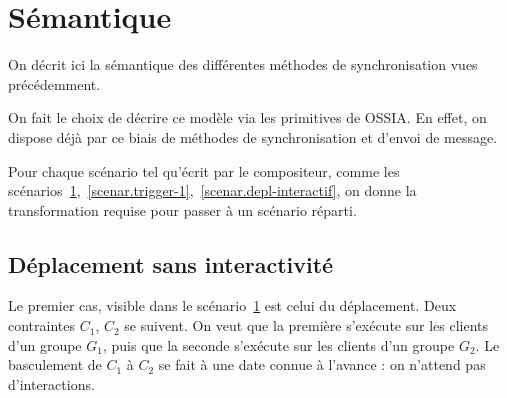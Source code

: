 \documentclass{article}
\newcommand\ossia{OSSIA\xspace}
\begin{document}
\section{Sémantique}\label{sec.semantique}
On décrit ici la sémantique des différentes méthodes de synchronisation vues précédemment.

On fait le choix de décrire ce modèle via les primitives de \ossia{}. 
En effet, on dispose déjà par ce biais de méthodes de synchronisation et d'envoi de message.

Pour chaque scénario tel qu'écrit par le compositeur, comme les scénarios~\ref{scenar.simple},~\ref{scenar.trigger-1},~\ref{scenar.depl-interactif}, on donne la transformation requise pour passer à un scénario réparti.


\subsection{Déplacement sans interactivité}
Le premier cas, visible dans le scénario~\ref{scenar.simple} est celui du déplacement.
Deux contraintes $C_1$, $C_2$ se suivent. 
On veut que la première s'exécute sur les clients d'un groupe $G_1$, puis que la seconde s'exécute sur les clients d'un groupe $G_2$. 
Le basculement de $C_1$ à $C_2$ se fait à une date connue à l'avance : on n'attend pas d'interactions.

\begin{figure}[h]
    \centering
    \begin{tikzpicture}
    
    \end{tikzpicture}
    \label{scenar.simple}
\end{figure} 
\end{document}
